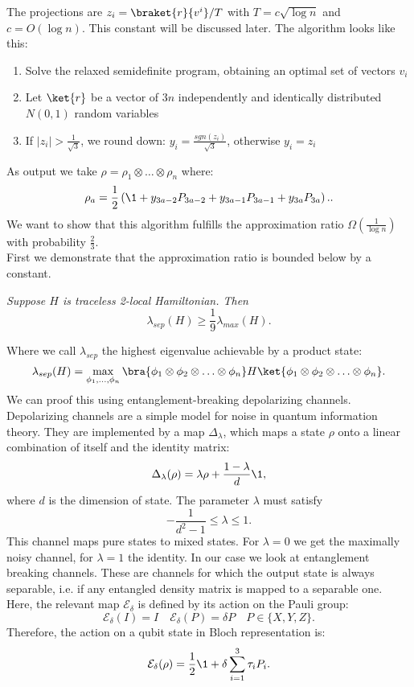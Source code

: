 The projections are $z_i=\braket{r}{v^i}/T$ with $T=c\sqrt{\log{}n}$ and $c=O(\log{}n)$.
This constant will be discussed later.
The algorithm looks like this:
\begin{enumerate}
	\item Solve the relaxed semidefinite program, obtaining an optimal set of vectors $v_i$
	\item Let $\ket{r}$ be a vector of $3n$ independently and identically distributed $N(0,1)$ random variables
	\item If $|z_i|>\frac{1}{\sqrt{3}}$, we round down: $y_i=\frac{sgn(z_i)}{\sqrt{3}}$, otherwise $y_i=z_i$
\end{enumerate}
As output we take $ \rho=\rho_1\otimes\ldots\otimes\rho_n$ where:\[
	\rho_a=\frac{1}{2}\left(\1 +y_{3a-2}P_{3a-2}+y_{3a-1}P_{3a-1}+y_{3a}P_{3a}\right).
.\]
We want to show that this algorithm fulfills the approximation ratio $\Omega(\frac{1}{\log{}n})$ with probability $\frac{2}{3}$.\\
First we demonstrate that the approximation ratio is bounded below by a constant.\cite{lieb73}
\begin{thm}\emph{
	Suppose $H$ is traceless 2-local Hamiltonian. Then \[
	\lambda_{sep}(H)\ge \frac{1}{9}\lambda_{max}(H)
.\]}
\end{thm}
Where we call $\lambda_{sep}$ the highest eigenvalue achievable by a product state: \[
	\lambda_{sep}(H)=\max_{\phi_1,\ldots,\phi_n}\bra{\phi_1\otimes\phi_2\otimes\ldots\otimes\phi_n}H\ket{\phi_1\otimes\phi_2\otimes\ldots\otimes\phi_n}
.\]
We can proof this using entanglement-breaking depolarizing channels.
Depolarizing channels are a simple model for noise in quantum information theory.\cite{nielsen11}
They are implemented by a map $\Delta_{\lambda}$, which maps a state  $\rho$ onto a linear combination of itself and the identity matrix:\cite{king02}\[
	\Delta_{\lambda}(\rho)=\lambda\rho+\frac{1-\lambda}{d}\1,
\]
where $d$ is the dimension of state. The parameter $\lambda$ must satisfy \[
	-\frac{1}{d^2-1}\le\lambda\le 1
.\]
This channel maps pure states to mixed states.
For $\lambda=0$ we get the maximally noisy channel, for $\lambda=1$ the identity.
In our case we look at entanglement breaking channels.
These are channels for which the output state is always separable, i.e. if any entangled density matrix is mapped to a separable one.\cite{horodecki03}
Here, the relevant map $\mathcal{E}_{\delta}$ is defined by its action on the Pauli group: \[
	\mathcal{E}_{\delta}(I)=I\quad\mathcal{E}_{\delta}(P)=\delta P\quad P\in \{X,Y,Z\}
.\]
Therefore, the action on a qubit state in Bloch representation is: \[
	\mathcal{E}_{\delta}(\rho) =  \frac{1}{2}\1 + \delta \sum_{i=1}^{3} \tau_i P_i
.\]
